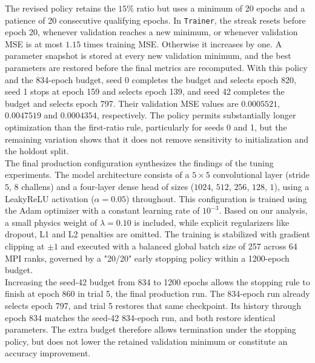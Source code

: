 The revised policy retains the $15\%$ ratio but uses a minimum of 20 epochs and a patience of 20 consecutive qualifying epochs. In \texttt{Trainer}, the streak resets before epoch 20, whenever validation reaches a new minimum, or whenever validation MSE is at most $1.15$ times training MSE. Otherwise it increases by one. A parameter snapshot is stored at every new validation minimum, and the best parameters are restored before the final metrics are recomputed. With this policy and the 834-epoch budget, seed 0 completes the budget and selects epoch 820, seed 1 stops at epoch 159 and selects epoch 139, and seed 42 completes the budget and selects epoch 797. Their validation MSE values are $0.0005521$, $0.0047519$ and $0.0004354$, respectively. The policy permits substantially longer optimization than the first-ratio rule, particularly for seeds 0 and 1, but the remaining variation shows that it does not remove sensitivity to initialization and the holdout split.\\

The final production configuration synthesizes the findings of the tuning experiments. The model architecture consists of a $5\times5$ convolutional layer (stride $5$, $8$ challens) and a four-layer dense head of sizes ($1024$, $512$, $256$, $128$, $1$), using a LeakyReLU activation ($\alpha=0.05$) throughout. This configuration is trained using the Adam optimizer with a constant learning rate of $10^{-3}$. Based on our analysis, a small physics weight of $\lambda=0.10$ is included, while explicit regularizers like dropout, L1 and L2 penalties are omitted. The training is stabilized with gradient clipping at $\pm 1$ and executed with a balanced global batch size of 257 across 64 MPI ranks, governed by a "20/20" early stopping policy within a 1200-epoch budget.\\

Increasing the seed-42 budget from 834 to 1200 epochs allows the stopping rule to finish at epoch 860 in trial 5, the final production run. The 834-epoch run already selects epoch 797, and trial 5 restores that same checkpoint. Its history through epoch 834 matches the seed-42 834-epoch run, and both restore identical parameters. The extra budget therefore allows termination under the stopping policy, but does not lower the retained validation minimum or constitute an accuracy improvement.\\

